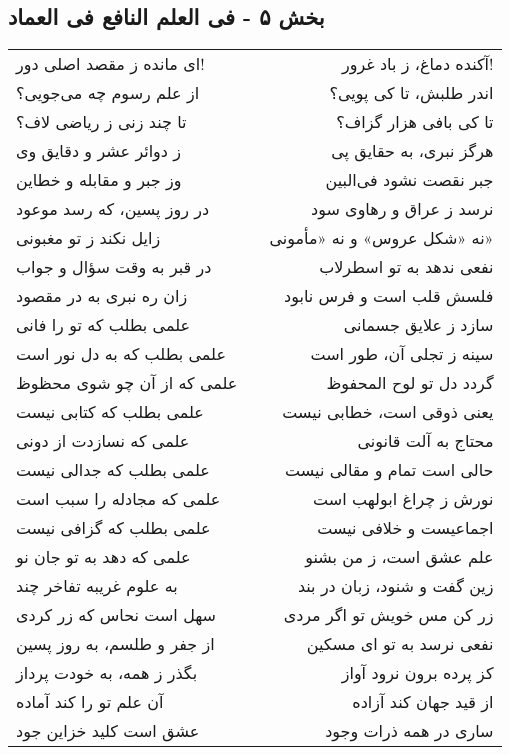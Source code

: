 \begin{center}
\section*{بخش ۵ - فی العلم النافع فی العماد}
\label{sec:005}
\begin{longtable}{l p{0.5cm} r}
ای مانده ز مقصد اصلی دور!
&&
آکنده دماغ، ز باد غرور!
\\
از علم رسوم چه می‌جویی؟
&&
اندر طلبش، تا کی پویی؟
\\
تا چند زنی ز ریاضی لاف؟
&&
تا کی بافی هزار گزاف؟
\\
ز دوائر عشر و دقایق وی
&&
هرگز نبری، به حقایق پی
\\
وز جبر و مقابله و خطاین
&&
جبر نقصت نشود فی‌البین
\\
در روز پسین، که رسد موعود
&&
نرسد ز عراق و رهاوی سود
\\
زایل نکند ز تو مغبونی
&&
نه «شکل عروس» و نه «مأمونی»
\\
در قبر به وقت سؤال و جواب
&&
نفعی ندهد به تو اسطرلاب
\\
زان ره نبری به در مقصود
&&
فلسش قلب است و فرس نابود
\\
علمی بطلب که تو را فانی
&&
سازد ز علایق جسمانی
\\
علمی بطلب که به دل نور است
&&
سینه ز تجلی آن، طور است
\\
علمی که از آن چو شوی محظوظ
&&
گردد دل تو لوح المحفوظ
\\
علمی بطلب که کتابی نیست
&&
یعنی ذوقی است، خطابی نیست
\\
علمی که نسازدت از دونی
&&
محتاج به آلت قانونی
\\
علمی بطلب که جدالی نیست
&&
حالی است تمام و مقالی نیست
\\
علمی که مجادله را سبب است
&&
نورش ز چراغ ابولهب است
\\
علمی بطلب که گزافی نیست
&&
اجماعیست و خلافی نیست
\\
علمی که دهد به تو جان نو
&&
علم عشق است، ز من بشنو
\\
به علوم غریبه تفاخر چند
&&
زین گفت و شنود، زبان در بند
\\
سهل است نحاس که زر کردی
&&
زر کن مس خویش تو اگر مردی
\\
از جفر و طلسم، به روز پسین
&&
نفعی نرسد به تو ای مسکین
\\
بگذر ز همه، به خودت پرداز
&&
کز پرده برون نرود آواز
\\
آن علم تو را کند آماده
&&
از قید جهان کند آزاده
\\
عشق است کلید خزاین جود
&&
ساری در همه ذرات وجود

\end{longtable}
\end{center}
